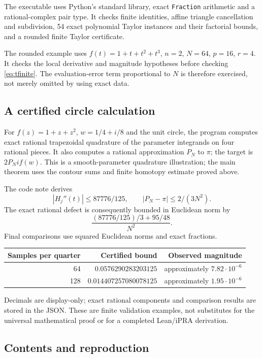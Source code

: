 \documentclass[11pt]{article}
\theoremstyle{definition}
\newcommand{\code}[1]{\texttt{#1}}
\begin{document}
The executable uses Python's standard library, exact \code{Fraction}
arithmetic and a rational-complex pair type. It checks finite identities,
affine triangle cancellation and subdivision, 54 exact polynomial Taylor
instances and their factorial bounds, and a rounded finite Taylor
certificate.

The rounded example uses \(f(t)=1+t+t^2+t^3\), \(n=2\), \(N=64\),
\(p=16\), \(r=4\). It checks the local derivative and magnitude hypotheses
before checking \eqref{eq:tfinite}. The evaluation-error term proportional
to \(N\) is therefore exercised, not merely omitted by using exact data.

\subsection{A certified circle calculation}

For \(f(z)=1+z+z^2\), \(w=1/4+i/8\) and the unit circle, the program
computes exact rational trapezoidal quadrature of the parameter
integrands on four rational pieces. It also computes a rational
approximation \(P_N\) to \(\pi\); the target is \(2P_Nif(w)\).
This is a smooth-parameter quadrature illustration; the main theorem
uses the contour sums and finite homotopy estimate proved above.

The code note derives
\[
 |H_j''(t)|\le87776/125,\qquad |P_N-\pi|\le2/(3N^2).
\]
The exact rational defect is consequently bounded in Euclidean norm by
\[
 \frac{(87776/125)/3+95/48}{N^2}.
\]
Final comparisons use squared Euclidean norms and exact fractions.
\begin{center}
\begin{tabular}{rrr}
\toprule
Samples per quarter & Certified bound & Observed magnitude\\\midrule
64 & \(0.0576290283203125\) & approximately \(7.82\cdot10^{-6}\)\\
128 & \(0.014407257080078125\) & approximately \(1.95\cdot10^{-6}\)\\
\bottomrule
\end{tabular}
\end{center}
Decimals are display-only; exact rational components and comparison
results are stored in the JSON.
These are finite validation examples, not substitutes for the universal
mathematical proof or for a completed Lean/iPRA derivation.

\subsection{Contents and reproduction}
\end{document}
